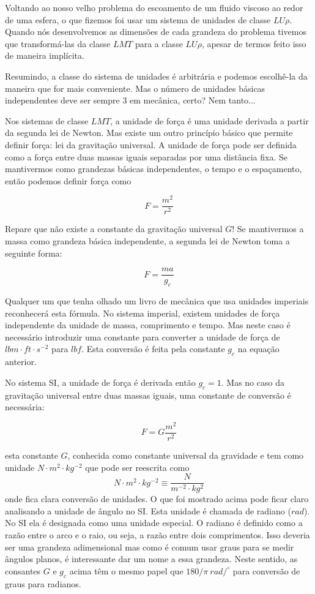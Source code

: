 Voltando ao nosso velho problema do escoamento de um fluido viscoso ao redor de uma esfera, o que fizemos foi usar um sistema de unidades de classe $LU\rho$. Quando nós desenvolvemos as dimensões de cada grandeza do problema tivemos que transformá-las da classe $LMT$ para a classe $LU\rho$, apesar de termos feito isso de maneira implícita.

Resumindo, a classe do sistema de unidades é arbitrária e podemos escolhê-la da maneira que for mais conveniente. Mas o número de unidades básicas independentes deve  ser sempre 3 em mecânica, certo? Nem tanto...

Nos sistemas de classe $LMT$, a unidade de força é uma unidade derivada a partir da segunda lei de Newton. Mas existe um outro princípio básico que permite definir força: lei da gravitação universal. A unidade de força pode ser definida como a força entre duas massas iguais separadas por uma distância fixa. Se mantivermos como grandezas básicas independentes, o tempo e o espaçamento, então podemos definir força como

\[
F = \frac{m^2}{r^2}
\]

Repare que não existe a constante da gravitação universal $G$! Se mantivermos a massa como grandeza básica independente, a segunda lei de Newton toma a seguinte forma:

\[
F = \frac{ma}{g_c}
\]

Qualquer um que tenha olhado um livro de mecânica que usa unidades imperiais reconhecerá esta fórmula. No sistema imperial, existem unidades de força independente da unidade de massa, comprimento e tempo. Mas neste caso é necessário introduzir uma constante para converter a unidade de força de $lbm\cdot ft \cdot s^{-2}$ para $lbf$. Esta conversão é feita pela constante $g_c$ na equação anterior.

No sistema SI, a unidade de força é derivada então $g_c = 1$. Mas no caso da gravitação universal entre duas massas iguais, uma constante de conversão é necessária:

\[
F = G \frac{m^2}{r^2}
\]

esta constante $G$, conhecida como constante universal da gravidade e tem como unidade $N\cdot m^2 \cdot kg^{-2}$ que pode ser reescrita como
\[
N\cdot m^2 \cdot kg^{-2} \equiv \frac{N}{m^{-2}\cdot kg^2}
\]
onde fica clara conversão de unidades. O que foi mostrado acima pode ficar claro analisando a unidade de ângulo no SI. Esta unidade é chamada de radiano ($rad$). No SI ela é designada como uma unidade especial. O radiano é definido como a razão entre o arco e o raio, ou seja, a razão entre dois comprimentos. Isso deveria ser uma grandeza adimensional mas como é comum usar graus para se medir ângulos planos, é interessante dar um nome a essa grandeza. Neste sentido, as consantes $G$ e $g_c$ acima têm o mesmo papel que $180/\pi\: rad/^\circ$ para conversão de graus para radianos.

